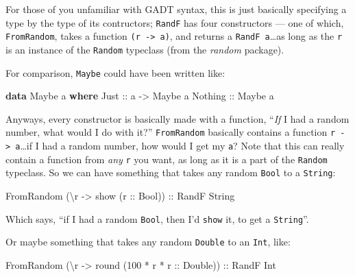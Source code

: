 \documentclass[]{article}
\newenvironment{Shaded}{}{}
\newcommand{\KeywordTok}[1]{\textcolor[rgb]{0.00,0.44,0.13}{\textbf{{#1}}}}
\newcommand{\DataTypeTok}[1]{\textcolor[rgb]{0.56,0.13,0.00}{{#1}}}
\newcommand{\DecValTok}[1]{\textcolor[rgb]{0.25,0.63,0.44}{{#1}}}
\newcommand{\OtherTok}[1]{\textcolor[rgb]{0.00,0.44,0.13}{{#1}}}
\newcommand{\FunctionTok}[1]{\textcolor[rgb]{0.02,0.16,0.49}{{#1}}}
\newcommand{\NormalTok}[1]{{#1}}
\begin{document}
For those of you unfamiliar with GADT syntax, this is just basically specifying
a type by the type of its contructors; \texttt{RandF} has four constructors ---
one of which, \texttt{FromRandom}, takes a function
\texttt{(r\ -\textgreater{}\ a)}, and returns a \texttt{RandF\ a}\ldots{}as long
as the \texttt{r} is an instance of the \texttt{Random} typeclass (from the
\emph{random} package).

For comparison, \texttt{Maybe} could have been written like:

\begin{Shaded}
\begin{Highlighting}[]
\KeywordTok{data} \DataTypeTok{Maybe} \NormalTok{a }\KeywordTok{where}
    \DataTypeTok{Just}\OtherTok{    ::} \NormalTok{a }\OtherTok{->} \DataTypeTok{Maybe} \NormalTok{a}
    \DataTypeTok{Nothing}\OtherTok{ ::} \DataTypeTok{Maybe} \NormalTok{a}
\end{Highlighting}
\end{Shaded}

Anyways, every constructor is basically made with a function, ``\emph{If} I had
a random number, what would I do with it?'' \texttt{FromRandom} basically
contains a function \texttt{r\ -\textgreater{}\ a}\ldots{}if I had a random
number, how would I get my \texttt{a}? Note that this can really contain a
function from \emph{any} \texttt{r} you want, as long as it is a part of the
\texttt{Random} typeclass. So we can have something that takes any random
\texttt{Bool} to a \texttt{String}:

\begin{Shaded}
\begin{Highlighting}[]
\DataTypeTok{FromRandom} \NormalTok{(\textbackslash{}r }\OtherTok{->} \NormalTok{show (}\OtherTok{r ::} \DataTypeTok{Bool}\NormalTok{))}\OtherTok{ ::} \DataTypeTok{RandF} \DataTypeTok{String}
\end{Highlighting}
\end{Shaded}

Which says, ``if I had a random \texttt{Bool}, then I'd \texttt{show} it, to get
a \texttt{String}''.

Or maybe something that takes any random \texttt{Double} to an \texttt{Int},
like:

\begin{Shaded}
\begin{Highlighting}[]
\DataTypeTok{FromRandom} \NormalTok{(\textbackslash{}r }\OtherTok{->} \NormalTok{round (}\DecValTok{100} \FunctionTok{*} \NormalTok{r }\FunctionTok{*}\OtherTok{ r ::} \DataTypeTok{Double}\NormalTok{))}\OtherTok{ ::} \DataTypeTok{RandF} \DataTypeTok{Int}
\end{Highlighting}
\end{Shaded}
\end{document}
